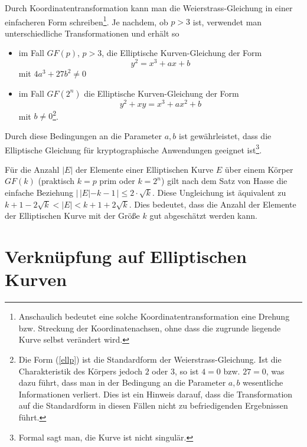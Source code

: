 \begin{refsegment}
Durch Koordinatentransformation kann man die Weierstrass-Gleichung in einer einfacheren Form schreiben\footnote{Anschaulich bedeutet eine solche Koordinatentransformation eine Drehung bzw. Streckung der Koordinatenachsen, ohne dass die zugrunde liegende Kurve selbst verändert wird.}.  Je nachdem, ob $p>3$ ist, verwendet man unterschiedliche Transformationen und erhält so

\begin{itemize}
\item im Fall $GF(p)$, $p>3$, die Elliptische Kurven-Gleichung der Form
\begin{equation}
 y^2 = x^3 + ax + b
\label{ellp}
\end{equation}
mit $4a^3+27b^2\ne 0$
\item im Fall $GF(2^n)$ die Elliptische Kurven-Gleichung der Form
\begin{equation}
 y^2+xy = x^3 + ax^2 + b
\label{ell2}
\end{equation}
mit $b\ne 0$\footnote{Die Form (\ref{ellp}) ist die Standardform der Weierstrass-Gleichung. Ist die Charakteristik des Körpers jedoch $2$ oder $3$, so ist $4=0$ bzw. $27=0$, was dazu führt, dass man in der Bedingung an die Parameter $a,b$ wesentliche Informationen verliert. Dies ist ein Hinweis darauf, dass die Transformation auf die Standardform in diesen Fällen nicht zu befriedigenden Ergebnissen führt.}.
\end{itemize}
Durch diese Bedingungen an die Parameter $a,b$ ist gewährleistet, dass die Elliptische Gleichung für kryptographische Anwendungen geeignet ist\footnote{Formal sagt man, die Kurve ist nicht singulär.}.


Für die Anzahl $|E|$ der Elemente einer Elliptischen Kurve $E$ über einem Körper $GF(k)$ (praktisch $k=p$ prim oder $k=2^n$) gilt nach dem Satz von Hasse \cite{Silverman2009} die einfache Beziehung $| \, |E| - k-1\,| \le 2\cdot \sqrt{k}$. Diese Ungleichung ist äquivalent zu $k+1 - 2\sqrt{k} < |E| < k+1+2\sqrt{k}$. Dies bedeutet, dass die Anzahl der Elemente der Elliptischen Kurve mit der Größe $k$ gut abgeschätzt werden kann.



\section{Verknüpfung auf Elliptischen Kurven}


\end{refsegment}

